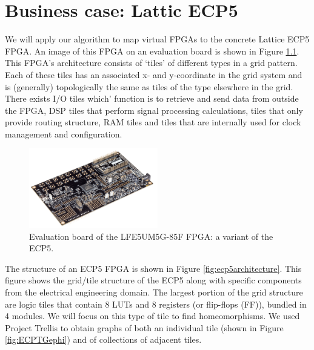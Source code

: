 \chapter{Business case: Lattic ECP5}
We will apply our algorithm to map virtual FPGAs to the concrete Lattice ECP5 FPGA. An image of this FPGA on an evaluation board is shown in Figure \ref{fig:evaluationboard}. This FPGA's architecture consists of `tiles' of different types in a grid pattern. Each of these tiles has an associated x- and y-coordinate in the grid system and is (generally) topologically the same as tiles of the type elsewhere in the grid. There exists I/O tiles which' function is to retrieve and send data from outside the FPGA, DSP tiles that perform signal processing calculations, tiles that only provide routing structure, RAM tiles and tiles that are internally used for clock management and configuration.

\begin{figure}
\centering
\includegraphics[width=0.5\textwidth]{images/ECP5.png}
\caption[Evaluation board of the LFE5UM5G-85F FPGA: a variant of the ECP5.]{Evaluation board of the LFE5UM5G-85F FPGA: a variant of the ECP5.\footnotemark}
\label{fig:evaluationboard}
\end{figure}

The structure of an ECP5 FPGA is shown in Figure \ref{fig:ecp5architecture}. This figure shows the grid/tile structure of the ECP5 along with specific components from the electrical engineering domain. The largest portion of the grid structure are logic tiles that contain 8 LUTs and 8 registers (or flip-flops (FF)), bundled in 4 modules. We will focus on this type of tile to find homeomorphisms. We used Project Trellis \cite{trellis} to obtain graphs of both an individual tile (shown in Figure \ref{fig:ECPTGephi}) and of collections of adjacent tiles.

